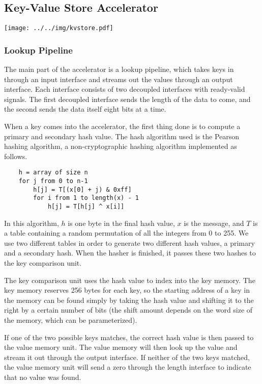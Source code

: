 \subsection{Key-Value Store Accelerator}

\begin{center}
\texttt{[image: ../../img/kvstore.pdf]}
\end{center}

\subsubsection{Lookup Pipeline}

The main part of the accelerator is a lookup pipeline, which takes keys in
through an input interface and streams out the values through an output
interface. Each interface consists of two decoupled interfaces with ready-valid
signals. The first decoupled interface sends the length of the data to come,
and the second sends the data itself eight bits at a time.

When a key comes into the accelerator, the first thing done is to compute a
primary and secondary hash value. The hash algorithm used is the Pearson
hashing algorithm, a non-cryptographic hashing algorithm implemented as follows.

\begin{verbatim}
    h = array of size n
    for j from 0 to n-1
        h[j] = T[(x[0] + j) & 0xff]
        for i from 1 to length(x) - 1
            h[j] = T[h[j] ^ x[i]]
\end{verbatim}

In this algorithm, \(h\) is one byte in the final hash value,
\(x\) is the message, and \(T\) is a table containing a random permutation of
all the integers from 0 to 255. We use two different tables in order to
generate two different hash values, a primary and a secondary hash. When the
hasher is finished, it passes these two hashes to the key comparison unit.

The key comparison unit uses the hash value to index into the key memory.
The key memory reserves 256 bytes for each key, so the starting address of a
key in the memory can be found simply by taking the hash value and shifting it
to the right by a certain number of bits (the shift amount depends on the
word size of the memory, which can be parameterized).

If one of the two possible keys matches, the correct hash value is then passed
to the value memory unit. The value memory will then look up the value and
stream it out through the output interface. If neither of the two keys matched,
the value memory unit will send a zero through the length interface to
indicate that no value was found.

